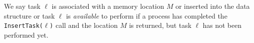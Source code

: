 We say task $\ell$ is associated with a memory location $M$ or inserted into the data structure or task $\ell$
is \emph{available} to perform if a process has completed the \texttt{InsertTask(}$\ell$\texttt{)} call and the location
$M$ is returned, but task $\ell$ has not been performed yet.

%
%
%


%
%
%
%
%
